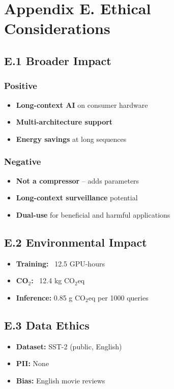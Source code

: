 
\section{Appendix E. Ethical Considerations}

\subsection{E.1 Broader Impact}

\subsubsection{Positive}
\begin{itemize}
\item \textbf{Long-context AI} on consumer hardware
\item \textbf{Multi-architecture support}
\item \textbf{Energy savings} at long sequences

\end{itemize}
\subsubsection{Negative}
\begin{itemize}
\item \textbf{Not a compressor} -- adds parameters
\item \textbf{Long-context surveillance} potential
\item \textbf{Dual-use} for beneficial and harmful applications

\end{itemize}
\subsection{E.2 Environmental Impact}

\begin{itemize}
\item \textbf{Training:} ~12.5 GPU-hours
\item \textbf{CO$_2$:} ~12.4 kg CO$_2$eq
\item \textbf{Inference:} 0.85 g CO$_2$eq per 1000 queries

\end{itemize}
\subsection{E.3 Data Ethics}

\begin{itemize}
\item \textbf{Dataset:} SST-2 (public, English)
\item \textbf{PII:} None
\item \textbf{Bias:} English movie reviews

\end{itemize}
